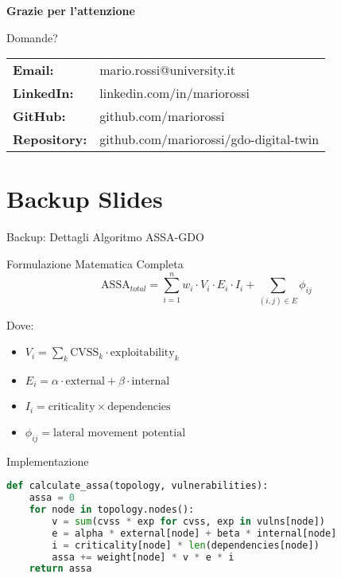 \documentclass[aspectratio=169,10pt]{beamer}
\begin{document}
\begin{frame}[plain]
\begin{center}
\vspace{2cm}
{\Huge \textbf{Grazie per l'attenzione}}

\vspace{1cm}
{\Large Domande?}

\vspace{2cm}
\begin{tabular}{ll}
\textbf{Email:} & mario.rossi@university.it \\
\textbf{LinkedIn:} & linkedin.com/in/mariorossi \\
\textbf{GitHub:} & github.com/mariorossi \\
\textbf{Repository:} & github.com/mariorossi/gdo-digital-twin
\end{tabular}
\end{center}
\end{frame}

\appendix
\section{Backup Slides}

\begin{frame}{Backup: Dettagli Algoritmo ASSA-GDO}
\begin{block}{Formulazione Matematica Completa}
\begin{equation*}
\text{ASSA}_{total} = \sum_{i=1}^{n} w_i \cdot V_i \cdot E_i \cdot I_i + \sum_{(i,j) \in E} \phi_{ij}
\end{equation*}

Dove:
\begin{itemize}
    \item $V_i = \sum_{k} \text{CVSS}_k \cdot \text{exploitability}_k$
    \item $E_i = \alpha \cdot \text{external} + \beta \cdot \text{internal}$
    \item $I_i = \text{criticality} \times \text{dependencies}$
    \item $\phi_{ij} = \text{lateral movement potential}$
\end{itemize}
\end{block}

\begin{exampleblock}{Implementazione}
\begin{lstlisting}[language=Python]
def calculate_assa(topology, vulnerabilities):
    assa = 0
    for node in topology.nodes():
        v = sum(cvss * exp for cvss, exp in vulns[node])
        e = alpha * external[node] + beta * internal[node]
        i = criticality[node] * len(dependencies[node])
        assa += weight[node] * v * e * i
    return assa
\end{lstlisting}
\end{exampleblock}
\end{frame}
\end{document}
